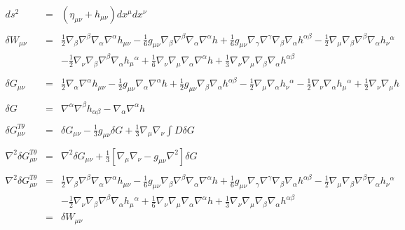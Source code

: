 \documentclass[10pt,letterpaper]{article}
\numberwithin{equation}{section}
\begin{document}
\begin{eqnarray}
ds^2 &=& (\eta_{\mu\nu} + h_{\mu\nu})dx^\mu dx^\nu
\nonumber\\ \nonumber\\
\delta W_{\mu\nu}&=&\tfrac{1}{2} \nabla_{\beta}\nabla^{\beta}\nabla_{\alpha}\nabla^{\alpha}h_{\mu \nu}
-  \tfrac{1}{6} g_{\mu \nu} \nabla_{\beta}\nabla^{\beta}\nabla_{\alpha}\nabla^{\alpha}h
+ \tfrac{1}{6} g_{\mu \nu} \nabla_{\gamma}\nabla^{\gamma}\nabla_{\beta}\nabla_{\alpha}h^{\alpha \beta}
-  \tfrac{1}{2} \nabla_{\mu}\nabla_{\beta}\nabla^{\beta}\nabla_{\alpha}h_{\nu}{}^{\alpha}
\nonumber\\
&& -  \tfrac{1}{2} \nabla_{\nu}\nabla_{\beta}\nabla^{\beta}\nabla_{\alpha}h_{\mu}{}^{\alpha}
+ \tfrac{1}{6} \nabla_{\nu}\nabla_{\mu}\nabla_{\alpha}\nabla^{\alpha}h
+ \tfrac{1}{3} \nabla_{\nu}\nabla_{\mu}\nabla_{\beta}\nabla_{\alpha}h^{\alpha \beta}
\nonumber\\\nonumber\\
\delta G_{\mu\nu}&=&\tfrac{1}{2} \nabla_{\alpha}\nabla^{\alpha}h_{\mu \nu}
-  \tfrac{1}{2} g_{\mu \nu} \nabla_{\alpha}\nabla^{\alpha}h
+ \tfrac{1}{2} g_{\mu \nu} \nabla_{\beta}\nabla_{\alpha}h^{\alpha \beta}
-  \tfrac{1}{2} \nabla_{\mu}\nabla_{\alpha}h_{\nu}{}^{\alpha}
-  \tfrac{1}{2} \nabla_{\nu}\nabla_{\alpha}h_{\mu}{}^{\alpha}
+ \tfrac{1}{2} \nabla_{\nu}\nabla_{\mu}h
\nonumber\\\nonumber\\
\delta G &=&  \nabla^\alpha \nabla^\beta h_{\alpha\beta} - \nabla_\alpha\nabla^\alpha h
\nonumber\\\nonumber\\
\delta G^{T\theta}_{\mu\nu} &=& \delta G_{\mu\nu} - \frac{1}{3}g_{\mu\nu}\delta G + \frac{1}{3}\nabla_\mu\nabla_\nu \int D \delta G
\nonumber\\ \nonumber\\
\nabla^2\delta  G^{T\theta}_{\mu\nu} &=& \nabla^2 \delta G_{\mu\nu} + \frac{1}{3}\left[ 
\nabla_\mu\nabla_\nu - g_{\mu\nu}\nabla^2\right]\delta G
\nonumber\\ \nonumber\\
\nabla^2 \delta G_{\mu\nu}^{T\theta} 
&=& \tfrac{1}{2} \nabla_{\beta}\nabla^{\beta}\nabla_{\alpha}\nabla^{\alpha}h_{\mu \nu}
-  \tfrac{1}{6} g_{\mu \nu} \nabla_{\beta}\nabla^{\beta}\nabla_{\alpha}\nabla^{\alpha}h
+ \tfrac{1}{6} g_{\mu \nu} \nabla_{\gamma}\nabla^{\gamma}\nabla_{\beta}\nabla_{\alpha}h^{\alpha \beta}
-  \tfrac{1}{2} \nabla_{\mu}\nabla_{\beta}\nabla^{\beta}\nabla_{\alpha}h_{\nu}{}^{\alpha}
\nonumber\\
&& -  \tfrac{1}{2} \nabla_{\nu}\nabla_{\beta}\nabla^{\beta}\nabla_{\alpha}h_{\mu}{}^{\alpha}
+ \tfrac{1}{6} \nabla_{\nu}\nabla_{\mu}\nabla_{\alpha}\nabla^{\alpha}h
+ \tfrac{1}{3} \nabla_{\nu}\nabla_{\mu}\nabla_{\beta}\nabla_{\alpha}h^{\alpha \beta}
\nonumber\\
&=& \delta W_{\mu\nu}
\end{eqnarray}
%
%
\end{document}
